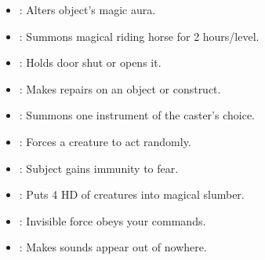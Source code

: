 \begin{itemize}
\item {}: Alters object's magic aura.
\item {}: Summons magical riding horse for 2 hours/level.
\item {}: Holds door shut or opens it.
\item {}: Makes repairs on an object or construct.
\item {}: Summons one instrument of the caster's choice.
\item {}: Forces a creature to act randomly.
\item {}: Subject gains immunity to fear.
\item {}: Puts 4 HD of creatures into magical slumber.
\item {}: Invisible force obeys your commands.
\item {}: Makes sounds appear out of nowhere.
\end{itemize}
